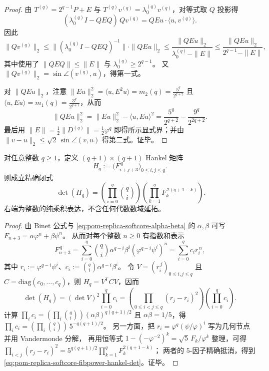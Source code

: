 \begin{proof}
由 \(T^{(q)}=2^{q-1}P+E\) 与 \(T^{(q)}v^{(q)}=\lambda_0^{(q)}v^{(q)}\)，对等式取 \(Q\) 投影得
\[
(\lambda_0^{(q)}I-QEQ)\,Qv^{(q)}=QEu\cdot \langle u,v^{(q)}\rangle.
\]
因此
\[
\|Qv^{(q)}\|_2\le \|(\lambda_0^{(q)}I-QEQ)^{-1}\|\cdot \|QEu\|_2
\le \frac{\|QEu\|_2}{\lambda_0^{(q)}-\|E\|}
\le \frac{\|QEu\|_2}{2^{q-1}-\|E\|},
\]
其中使用了 \(\|QEQ\|\le \|E\|\) 与 \(\lambda_0^{(q)}\ge 2^{q-1}\)。
又 \(\|Qv^{(q)}\|_2=\sin\angle(v^{(q)},u)\)，得第一式。
\par
对 \(\|QEu\|_2\)，注意
\(
\|Eu\|_2^2=\langle u,E^2u\rangle=m_2(q)=\frac{5^q}{2^{q+2}}
\) 且 \(\langle u,Eu\rangle=m_1(q)=\frac{3^q}{2^{q+1}}\)，从而
\[
\|QEu\|_2^2=\|Eu\|_2^2-\langle u,Eu\rangle^2
=\frac{5^q}{2^{q+2}}-\frac{9^q}{2^{2q+2}}.
\]
最后用 \(\|E\|=\frac12\|D^{(q)}\|=\frac12\varphi^q\) 即得所示显式界；并由 \(\|v-u\|_2\le \sqrt2\,\sin\angle(v,u)\) 得第二式。证毕。
\end{proof}

\begin{theorem}\label{thm:pom-replica-softcore-fibonacci-power-hankel-determinant}
对任意整数 \(q\ge 1\)，定义 \((q+1)\times(q+1)\) Hankel 矩阵
\[
H_q:=\bigl(F_{i+j+3}^{\,q}\bigr)_{0\le i,j\le q}.
\]
则成立精确闭式
\begin{equation}\label{eq:pom-replica-softcore-fibpower-hankel-det}
\boxed{\;
\det(H_q)
=\left(\prod_{i=0}^{q}\binom{q}{i}\right)
\left(\prod_{k=1}^{q}F_k^{\,2(q+1-k)}\right).}
\end{equation}
右端为整数的纯乘积表达，不含任何代数数域延拓。
\end{theorem}
\begin{proof}
由 Binet 公式与 \eqref{eq:pom-replica-softcore-alpha-beta} 的 \(\alpha,\beta\) 可写
\(
F_{n+3}=\alpha\varphi^n+\beta\psi^n
\)。
从而对每个整数 \(n\ge 0\) 有指数和表示
\[
F_{n+3}^{\,q}
=\sum_{i=0}^{q}\binom{q}{i}\alpha^{q-i}\beta^i(\varphi^{q-i}\psi^i)^{n}
=\sum_{i=0}^{q}c_i r_i^{\,n},
\]
其中 \(r_i:=\varphi^{q-i}\psi^i\)、\(c_i:=\binom{q}{i}\alpha^{q-i}\beta^i\)。
令 \(V=(r_i^{\,j})_{0\le i,j\le q}\) 且 \(C=\mathrm{diag}(c_0,\dots,c_q)\)，则 \(H_q=V^{\mathsf T}CV\)，因而
\[
\det(H_q)=(\det V)^2\prod_{i=0}^{q}c_i
=\left(\prod_{0\le i<j\le q}(r_j-r_i)^2\right)\left(\prod_{i=0}^{q}c_i\right).
\]
计算 \(\prod_i c_i=(\prod_i\binom{q}{i})(\alpha\beta)^{q(q+1)/2}\) 且 \(\alpha\beta=1/5\)，得
\(
\prod_i c_i=(\prod_i\binom{q}{i})\,5^{-q(q+1)/2}
\)。
另一方面，把 \(r_i=\varphi^q(\psi/\varphi)^i\) 写为几何节点并用 Vandermonde 分解，
再用恒等式 \(1-(-\varphi^{-2})^k=\sqrt5\,F_k/\varphi^{k}\) 整理，可得
\(
\prod_{i<j}(r_j-r_i)^2
=5^{q(q+1)/2}\prod_{k=1}^{q}F_k^{2(q+1-k)}
\)；
两者的 \(5\)-因子精确抵消，得到 \eqref{eq:pom-replica-softcore-fibpower-hankel-det}。证毕。
\end{proof}

